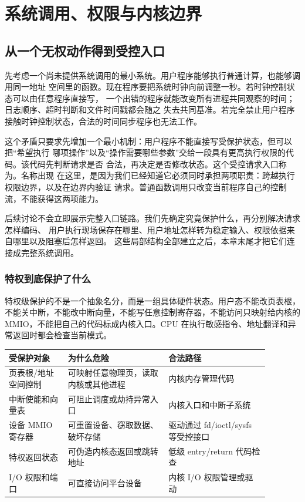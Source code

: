 \chapter{系统调用、权限与内核边界}

\section{从一个无权动作得到受控入口}

先考虑一个尚未提供系统调用的最小系统。用户程序能够执行普通计算，也能够调用同一地址
空间里的函数。现在程序要把系统时钟向前调整一秒。若时钟控制状态可以由任意程序直接写，
一个出错的程序就能改变所有进程共同观察的时间；日志顺序、超时判断和文件时间戳都会随之
失去共同基准。若完全禁止用户程序接触时钟控制状态，合法的时间同步程序也无法工作。

这个矛盾只要求先增加一个最小机制：用户程序不能直接写受保护状态，但可以把“希望执行
哪项操作”以及“操作需要哪些参数”交给一段具有更高执行权限的代码。该代码先判断请求是否
合法，再决定是否修改状态。这个受控请求入口称为。名称出现
在这里，是因为我们已经知道它必须同时承担两项职责：跨越执行权限边界，以及在边界内验证
请求。普通函数调用只改变当前程序自己的控制流，不能获得这两项能力。

后续讨论不会立即展示完整入口链路。我们先确定究竟保护什么，再分别解决请求怎样编码、
用户执行现场保存在哪里、用户地址怎样转为稳定输入、权限依据来自哪里以及阻塞后怎样返回。
这些局部结构全部建立之后，本章末尾才把它们连接成完整系统调用。

\subsection{特权到底保护了什么}

特权级保护的不是一个抽象名分，而是一组具体硬件状态。用户态不能改页表根，不能关中断，不能改中断向量，不能写任意控制寄存器，不能访问只映射给内核的 MMIO，不能把自己的代码标成内核入口。CPU 在执行敏感指令、地址翻译和异常返回时都会检查当前模式。

\begin{longtable}{|p{0.2\linewidth}|p{0.34\linewidth}|p{0.34\linewidth}|}
\toprule
受保护对象 & 为什么危险 & 合法路径 \\
\midrule
页表根/地址空间控制 & 可映射任意物理页，读取内核或其他进程 & 内核内存管理代码 \\\tablerowrule
中断使能和向量表 & 可阻止调度或劫持异常入口 & 内核入口和中断子系统 \\\tablerowrule
设备 MMIO 寄存器 & 可重置设备、窃取数据、破坏存储 & 驱动通过 fd/ioctl/sysfs 等受控接口 \\\tablerowrule
特权返回状态 & 可伪造内核态返回或跳转地址 & 低级 entry/return 代码检查 \\\tablerowrule
I/O 权限和端口 & 可直接访问平台设备 & 内核 I/O 权限管理或驱动 \\
\bottomrule
\end{longtable}

